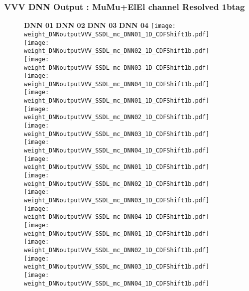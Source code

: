 \documentclass[9pt]{beamer}
\begin{document}
\begin{frame}
	\frametitle{VVV DNN Output : MuMu+ElEl channel Resolved 1btag}
	\begin{figure}
	    \textbf{DNN 01} \hspace{1.2cm} \textbf{DNN 02} \hspace{1.2cm} \textbf{DNN 03} \hspace{1.2cm} \textbf{DNN 04}
        \centering
		\texttt{[image: weight\_DNNoutputVVV\_SSDL\_mc\_DNN01\_1D\_CDFShift1b.pdf]}
		\texttt{[image: weight\_DNNoutputVVV\_SSDL\_mc\_DNN02\_1D\_CDFShift1b.pdf]}
		\texttt{[image: weight\_DNNoutputVVV\_SSDL\_mc\_DNN03\_1D\_CDFShift1b.pdf]}
		\texttt{[image: weight\_DNNoutputVVV\_SSDL\_mc\_DNN04\_1D\_CDFShift1b.pdf]}\\
		\texttt{[image: weight\_DNNoutputVVV\_SSDL\_mc\_DNN01\_1D\_CDFShift1b.pdf]}
		\texttt{[image: weight\_DNNoutputVVV\_SSDL\_mc\_DNN02\_1D\_CDFShift1b.pdf]}
		\texttt{[image: weight\_DNNoutputVVV\_SSDL\_mc\_DNN03\_1D\_CDFShift1b.pdf]}
		\texttt{[image: weight\_DNNoutputVVV\_SSDL\_mc\_DNN04\_1D\_CDFShift1b.pdf]}\\
		\texttt{[image: weight\_DNNoutputVVV\_SSDL\_mc\_DNN01\_1D\_CDFShift1b.pdf]}
		\texttt{[image: weight\_DNNoutputVVV\_SSDL\_mc\_DNN02\_1D\_CDFShift1b.pdf]}
		\texttt{[image: weight\_DNNoutputVVV\_SSDL\_mc\_DNN03\_1D\_CDFShift1b.pdf]}
		\texttt{[image: weight\_DNNoutputVVV\_SSDL\_mc\_DNN04\_1D\_CDFShift1b.pdf]}\\
		\texttt{[image: weight\_DNNoutputVVV\_SSDL\_mc\_DNN01\_1D\_CDFShift1b.pdf]}
		\texttt{[image: weight\_DNNoutputVVV\_SSDL\_mc\_DNN02\_1D\_CDFShift1b.pdf]}
		\texttt{[image: weight\_DNNoutputVVV\_SSDL\_mc\_DNN03\_1D\_CDFShift1b.pdf]}
		\texttt{[image: weight\_DNNoutputVVV\_SSDL\_mc\_DNN04\_1D\_CDFShift1b.pdf]}\\
	\end{figure}
\end{frame}
\end{document}
